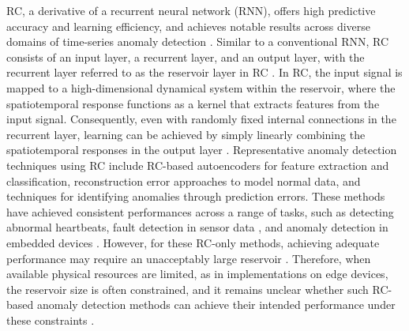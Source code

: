 \documentclass[pdflatex,sn-nature]{sn-jnl}
\theoremstyle{thmstyleone}%
\theoremstyle{thmstyletwo}%
\theoremstyle{thmstylethree}%
\begin{document}
RC, a derivative of a recurrent neural network (RNN), offers high predictive accuracy and learning efficiency, and achieves notable results across diverse domains of time-series anomaly detection \cite{lukovsevivcius2009reservoir,cucchi2022hands,tanaka2019recent,nakajima2020physical}.
Similar to a conventional RNN, RC consists of an input layer, a recurrent layer, and an output layer, with the recurrent layer referred to as the reservoir layer in RC \cite{jaeger2001echo}.
In RC, the input signal is mapped to a high-dimensional dynamical system within the reservoir, where the spatiotemporal response functions as a kernel that extracts features from the input signal.
Consequently, even with randomly fixed internal connections in the recurrent layer, learning can be achieved by simply linearly combining the spatiotemporal responses in the output layer \cite{cucchi2022hands}.
Representative anomaly detection techniques using RC include RC-based autoencoders for feature extraction and classification, reconstruction error approaches to model normal data, and techniques for identifying anomalies through prediction errors\cite{Chen2018ImbalancedDE,kato2024reconstructive,de2022novel}.
These methods have achieved consistent performances across a range of tasks, such as detecting abnormal heartbeats\cite{Chen2018ImbalancedDE}, fault detection in sensor data \cite{long2019novel}, and anomaly detection in embedded devices \cite{carta2022efficient,chang2009mote}.
However, for these RC-only methods, achieving adequate performance may require an unacceptably large reservoir \cite{lukovsevivcius2009reservoir,lukovsevivcius2012practical}.
Therefore, when available physical resources are limited, as in implementations on edge devices, the reservoir size is often constrained, and it remains unclear whether such RC-based anomaly detection methods can achieve their intended performance under these constraints \cite{tanaka2019recent,nakajima2020physical,stepney2024physical}.
\end{document}
